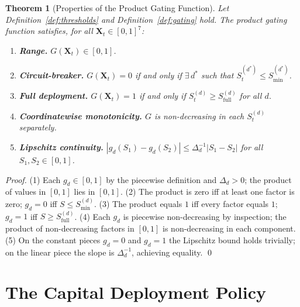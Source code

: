 \documentclass[12pt,openany]{book}
\numberwithin{equation}{chapter}
\theoremstyle{plain}
\newtheorem{theorem}{Theorem}[chapter]
\theoremstyle{definition}
\theoremstyle{remark}
\def\mathcal#1{#1}%
\begin{document}
\begin{theorem}[Properties of the Product Gating Function]
\label{thm:gating}
Let Definition~\ref{def:thresholds} and Definition~\ref{def:gating}
hold.  The product gating function satisfies, for all
$\mathbf{X}_t \in [0,1]^7$:
\begin{enumerate}[label=\textup{(\arabic*)}]
  \item \textbf{Range.}  $G(\mathbf{X}_t) \in [0,1]$.
  \item \textbf{Circuit-breaker.}  $G(\mathbf{X}_t) = 0$ if and
        only if $\exists\,d^*$ such that
        $\mathcal{S}_t^{(d^*)} \leq \mathcal{S}_{\min}^{(d^*)}$.
  \item \textbf{Full deployment.}  $G(\mathbf{X}_t) = 1$ if and
        only if $\mathcal{S}_t^{(d)} \geq
        \mathcal{S}_{\mathrm{full}}^{(d)}$ for all $d$.
  \item \textbf{Coordinatewise monotonicity.}
        $G$ is non-decreasing in each $\mathcal{S}_t^{(d)}$
        separately.
  \item \textbf{Lipschitz continuity.}
        $|g_d(\mathcal{S}_1) - g_d(\mathcal{S}_2)|
         \leq \Delta_d^{-1} |\mathcal{S}_1 - \mathcal{S}_2|$
        for all $\mathcal{S}_1, \mathcal{S}_2 \in [0,1]$.
\end{enumerate}
\end{theorem}

\begin{proof}
(1) Each $g_d \in [0,1]$ by the piecewise definition and
$\Delta_d > 0$; the product of values in $[0,1]$ lies in $[0,1]$.
(2) The product is zero iff at least one factor is zero; $g_d = 0$
iff $\mathcal{S} \leq \mathcal{S}_{\min}^{(d)}$.
(3) The product equals $1$ iff every factor equals $1$; $g_d = 1$
iff $\mathcal{S} \geq \mathcal{S}_{\mathrm{full}}^{(d)}$.
(4) Each $g_d$ is piecewise non-decreasing by inspection; the
product of non-decreasing factors in $[0,1]$ is non-decreasing in
each component.
(5) On the constant pieces $g_d = 0$ and $g_d = 1$ the Lipschitz
bound holds trivially; on the linear piece the slope is
$\Delta_d^{-1}$, achieving equality.
\qed
\end{proof}

\section{The Capital Deployment Policy}
\end{document}
